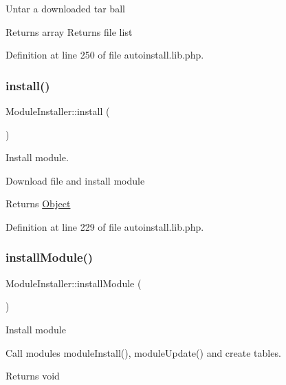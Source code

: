 Untar a downloaded tar ball

\begin{DoxyReturn}{Returns}
array Returns file list 
\end{DoxyReturn}


Definition at line 250 of file autoinstall.\+lib.\+php.

\hypertarget{classModuleInstaller_aada761e2e31fc610bb69680991813bf8}{}\label{classModuleInstaller_aada761e2e31fc610bb69680991813bf8} 
\subsubsection{\texorpdfstring{install()}{install()}}
{\footnotesize\ttfamily Module\+Installer\+::install (\begin{DoxyParamCaption}{ }\end{DoxyParamCaption})}

Install module.

Download file and install module

\begin{DoxyReturn}{Returns}
\hyperlink{classObject}{Object} 
\end{DoxyReturn}


Definition at line 229 of file autoinstall.\+lib.\+php.

\hypertarget{classModuleInstaller_a07eb4b03dfd704124e05142cef5c9e82}{}\label{classModuleInstaller_a07eb4b03dfd704124e05142cef5c9e82} 
\subsubsection{\texorpdfstring{install\+Module()}{installModule()}}
{\footnotesize\ttfamily Module\+Installer\+::install\+Module (\begin{DoxyParamCaption}{ }\end{DoxyParamCaption})}

Install module

Call module\textquotesingle{}s module\+Install(), module\+Update() and create tables.

\begin{DoxyReturn}{Returns}
void 
\end{DoxyReturn}


